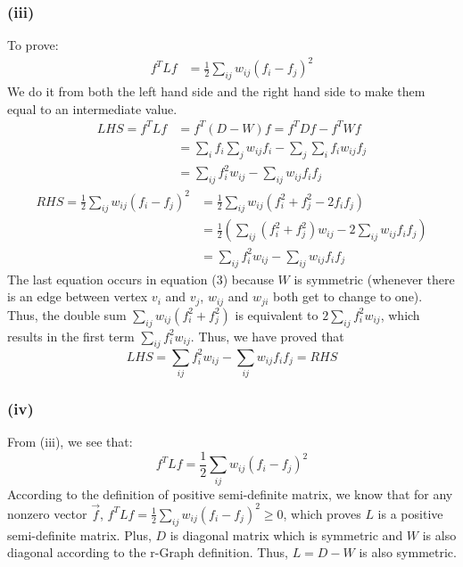 \documentclass[]{homework}
\begin{document}
\subsubsection*{(iii)}
To prove:
\begin{equation}
    \begin{aligned}
        f^T Lf &= \frac{1}{2} \sum_{ij} w_{ij} (f_i - f_j)^2
    \end{aligned}
\end{equation}
We do it from both the left hand side and the right hand side to make them equal to an intermediate value.
\begin{equation}
    \begin{aligned}
        LHS = f^T Lf &= f^T (D-W)f = f^T D f - f^T W f \\&= \sum_i f_i\sum_{j}w_{ij}f_i - \sum_j \sum_i f_i w_{ij} f_j\\&= \sum_{ij} f_i^2 w_{ij} - \sum_{ij} w_{ij} f_if_j
    \end{aligned}
\end{equation}
\begin{equation}
    \begin{aligned}
        RHS = \frac{1}{2} \sum_{ij} w_{ij} (f_i - f_j)^2 &= \frac{1}{2} \sum_{ij} w_{ij} (f_i^2 + f_j^2 - 2f_if_j)\\&= \frac{1}{2}( \sum_{ij} (f_i^2+f_j^2) w_{ij} - 2 \sum_{ij} w_{ij} f_if_j )\\&=\sum_{ij} f_i^2 w_{ij} - \sum_{ij} w_{ij} f_if_j
    \end{aligned}
\end{equation}
The last equation occurs in equation (3) because $W$ is symmetric (whenever there is an edge between vertex $v_i$ and $v_j$, $w_{ij}$ and $w_{ji}$ both get to change to one). Thus, the double sum $\sum_{ij} w_{ij} (f_i^2 + f_j^2)$ is equivalent to  $2 \sum_{ij} f_i^2w_{ij} $, which results in the first term $\sum_{ij} f_i^2 w_{ij}$.
Thus, we have proved that 
$$ LHS = \sum_{ij} f_i^2 w_{ij} - \sum_{ij} w_{ij} f_if_j= RHS$$

\subsubsection*{(iv)}
From (iii), we see that:
$$ f^T Lf = \frac{1}{2} \sum_{ij} w_{ij} (f_i - f_j)^2$$
According to the definition of positive semi-definite matrix, we know that for any nonzero vector $\Vec{f}$, $f^T Lf = \frac{1}{2} \sum_{ij} w_{ij} (f_i - f_j)^2 \geq 0$, which proves $L$ is a positive semi-definite matrix.
Plus, $D$ is diagonal matrix which is symmetric and $W$ is also diagonal according to the r-Graph definition. Thus, $L=D-W$ is also symmetric.
\end{document}

